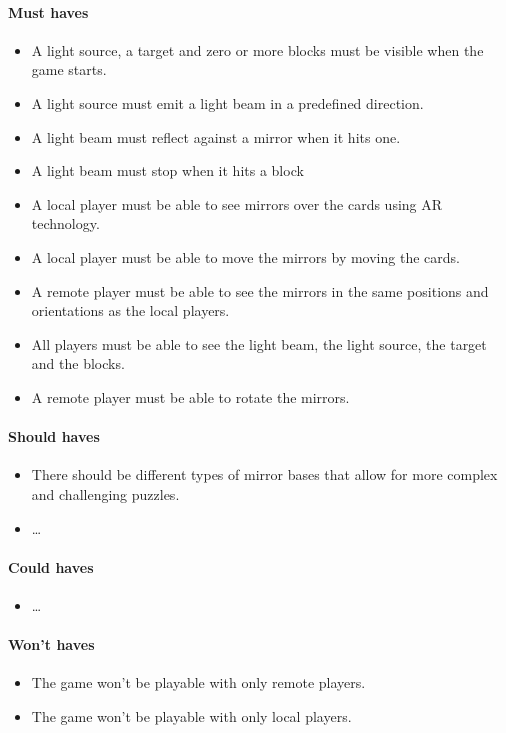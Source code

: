 \paragraph{Must haves}
\begin{itemize}
	\item A light source, a target and zero or more blocks must be visible when the game starts.
	\item A light source must emit a light beam in a predefined direction.
	\item A light beam must reflect against a mirror when it hits one.
	\item A light beam must stop when it hits a block
	\item A local player must be able to see mirrors over the cards using AR technology.
	\item A local player must be able to move the mirrors by moving the cards.
	\item A remote player must be able to see the mirrors in the same positions and 
		  orientations as the local players.
	\item All players must be able to see the light beam, the light source, the target and the blocks.
	\item A remote player must be able to rotate the mirrors.
\end{itemize}

\paragraph{Should haves}
\begin{itemize}
	\item There should be different types of mirror bases that allow for more complex
		  and challenging puzzles.
	\item \dots %
\end{itemize}

\paragraph{Could haves}
\begin{itemize}
	\item \dots %
\end{itemize}

\paragraph{Won't haves}
\begin{itemize}
	\item The game won't be playable with only remote players.
	\item The game won't be playable with only local players.
\end{itemize}